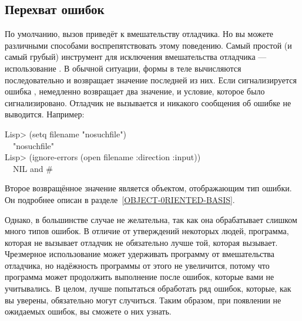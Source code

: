 \subsection{Перехват ошибок}
\label{TRAPPING-ERRORS}

По умолчанию, вызов  приведёт к вмешательству отладчика. Но вы можете
различными способами воспрепятствовать этому поведению. Самый простой (и
самый грубый) инструмент для исключения вмешательства отладчика ---
использование . В обычной ситуации, формы в теле
 вычисляются последовательно и возвращает значение последней
из них. Если сигнализируется ошибка ,  немедленно
возвращает два значение,  и условие, которое было
сигнализировано. Отладчик не вызывается и никакого сообщения об ошибке не
выводится. Например:
\begin{lisp}
Lisp> (setq filename "nosuchfile") \\
~\EV\ "nosuchfile" \\
Lisp> (ignore-errors (open filename :direction :input)) \\
~\EV\ NIL \textrm{and} \#<FILE-ERROR 3437523>
\end{lisp}
Второе возвращённое значение является объектом, отображающим тип ошибки. Он
подробнее описан в разделе~\ref{OBJECT-0RIENTED-BASIS}.

Однако, в большинстве случае  не желательна, так как она
обрабатывает слишком много типов ошибок. В отличие от утверждений некоторых
людей, программа, которая не вызывает отладчик не обязательно лучше той, которая
вызывает.
Чрезмерное использование  может удерживать программу от
вмешательства отладчика, но надёжность программы от этого не увеличится, потому
что программа может продолжить выполнение после ошибок, которые вами не
учитывались. В целом, лучше попытаться обработать ряд ошибок, которые, как вы
уверены, обязательно могут случиться. Таким образом, при появлении не ожидаемых
ошибок, вы сможете о них узнать.

